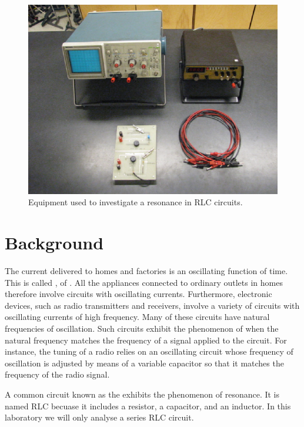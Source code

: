 \begin{figure}[H]
    \centering
    \includegraphics[scale = 0.8]{Images/Res1.PNG}
    \caption{Equipment used to investigate a resonance in RLC circuits.}
    \label{fig:Res1}
\end{figure}


\section{Background}


The current delivered to homes and factories is an oscillating function of time. This is called , of . All the appliances connected to ordinary outlets in homes therefore involve circuits with oscillating currents. Furthermore, electronic devices, such as radio transmitters and receivers, involve a variety of circuits with oscillating currents of high frequency. Many of these circuits have natural frequencies of oscillation. Such circuits exhibit the phenomenon of  when the natural frequency matches the frequency of a signal applied to the circuit. For instance, the tuning of a radio relies on an oscillating circuit whose frequency of oscillation is adjusted by means of a variable capacitor so that it matches the frequency of the radio signal.

\noindent A common circuit known as the  exhibits the phenomenon of resonance. It is named RLC becuase it includes a resistor, a capacitor, and an inductor. In this laboratory we will only analyse a series RLC circuit.

